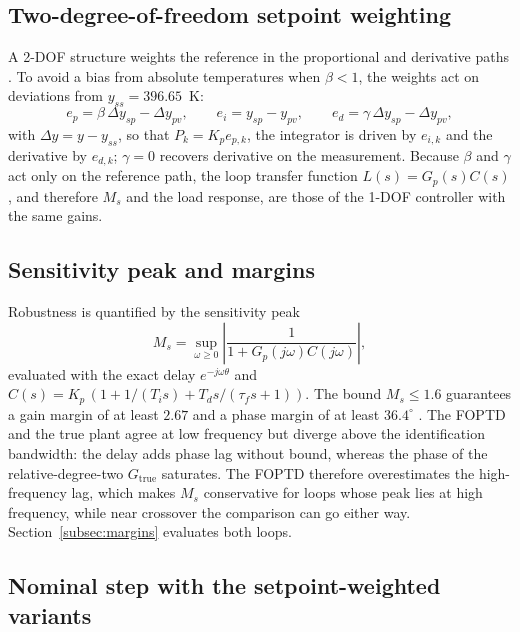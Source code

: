 \subsection{Two-degree-of-freedom setpoint weighting}
\label{subsec:two_dof}
A 2-DOF structure weights the reference in the proportional and derivative paths \cite{astrom2006pid}. To avoid a bias from absolute temperatures when $\beta < 1$, the weights act on deviations from $y_{ss} = 396.65$~K:
\begin{equation}
    e_p = \beta\,\Delta y_{sp} - \Delta y_{pv}, \qquad e_i = y_{sp} - y_{pv}, \qquad e_d = \gamma\,\Delta y_{sp} - \Delta y_{pv},
    \label{eq:two_dof}
\end{equation}
with $\Delta y = y - y_{ss}$, so that $P_k = K_p e_{p,k}$, the integrator is driven by $e_{i,k}$ and the derivative by $e_{d,k}$; $\gamma = 0$ recovers derivative on the measurement. Because $\beta$ and $\gamma$ act only on the reference path, the loop transfer function $L(s) = G_p(s)C(s)$, and therefore $M_s$ and the load response, are those of the 1-DOF controller with the same gains.

\subsection{Sensitivity peak and margins}
\label{subsec:sensitivity_theory}
Robustness is quantified by the sensitivity peak \cite{astrom2006pid, skogestad2005multivariable}
\begin{equation}
    M_s = \sup_{\omega \ge 0} \left|\frac{1}{1 + G_p(j\omega)C(j\omega)}\right|,
    \label{eq:sensitivity_func}
\end{equation}
evaluated with the exact delay $e^{-j\omega\theta}$ and $C(s) = K_p\,(1 + 1/(T_i s) + T_d s/(\tau_f s + 1))$. The bound $M_s \le 1.6$ guarantees a gain margin of at least $2.67$ and a phase margin of at least $36.4^\circ$ \cite{garpinger2014performance, padula2011tuning}. The FOPTD and the true plant agree at low frequency but diverge above the identification bandwidth: the delay adds phase lag without bound, whereas the phase of the relative-degree-two $G_{\text{true}}$ saturates. The FOPTD therefore overestimates the high-frequency lag, which makes $M_s$ conservative for loops whose peak lies at high frequency, while near crossover the comparison can go either way. Section~\ref{subsec:margins} evaluates both loops.

\subsection{Nominal step with the setpoint-weighted variants}


